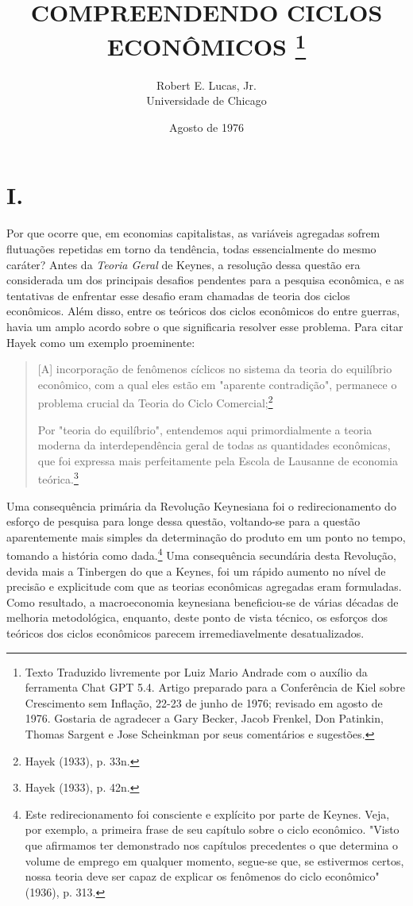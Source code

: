 \documentclass[12pt]{article}
\title{COMPREENDENDO CICLOS ECONÔMICOS \thanks{Texto Traduzido livremente por Luiz Mario Andrade com o auxílio da ferramenta Chat GPT 5.4. Artigo preparado para a Conferência de Kiel sobre Crescimento sem Inflação, 22-23 de junho de 1976; revisado em agosto de 1976. Gostaria de agradecer a Gary Becker, Jacob Frenkel, Don Patinkin, Thomas Sargent e Jose Scheinkman por seus comentários e sugestões.}}
\author{Robert E. Lucas, Jr. \\ Universidade de Chicago}
\date{Agosto de 1976}
\begin{document}
\maketitle

\section*{I.}

Por que ocorre que, em economias capitalistas, as variáveis agregadas sofrem flutuações repetidas em torno da tendência, todas essencialmente do mesmo caráter? Antes da \textit{Teoria Geral} de Keynes, a resolução dessa questão era considerada um dos principais desafios pendentes para a pesquisa econômica, e as tentativas de enfrentar esse desafio eram chamadas de teoria dos ciclos econômicos. Além disso, entre os teóricos dos ciclos econômicos do entre guerras, havia um amplo acordo sobre o que significaria resolver esse problema. Para citar Hayek como um exemplo proeminente:

\begin{quote}
[A] incorporação de fenômenos cíclicos no sistema da teoria do equilíbrio econômico, com a qual eles estão em "aparente contradição", permanece o problema crucial da Teoria do Ciclo Comercial;\footnote{Hayek (1933), p. 33n.}

Por "teoria do equilíbrio", entendemos aqui primordialmente a teoria moderna da interdependência geral de todas as quantidades econômicas, que foi expressa mais perfeitamente pela Escola de Lausanne de economia teórica.\footnote{Hayek (1933), p. 42n.}
\end{quote}

Uma consequência primária da Revolução Keynesiana foi o redirecionamento do esforço de pesquisa para longe dessa questão, voltando-se para a questão aparentemente mais simples da determinação do produto em um ponto no tempo, tomando a história como dada.\footnote{Este redirecionamento foi consciente e explícito por parte de Keynes. Veja, por exemplo, a primeira frase de seu capítulo sobre o ciclo econômico. "Visto que afirmamos ter demonstrado nos capítulos precedentes o que determina o volume de emprego em qualquer momento, segue-se que, se estivermos certos, nossa teoria deve ser capaz de explicar os fenômenos do ciclo econômico" (1936), p. 313.} Uma consequência secundária desta Revolução, devida mais a Tinbergen do que a Keynes, foi um rápido aumento no nível de precisão e explicitude com que as teorias econômicas agregadas eram formuladas. Como resultado, a macroeconomia keynesiana beneficiou-se de várias décadas de melhoria metodológica, enquanto, deste ponto de vista técnico, os esforços dos teóricos dos ciclos econômicos parecem irremediavelmente desatualizados.
\end{document}
